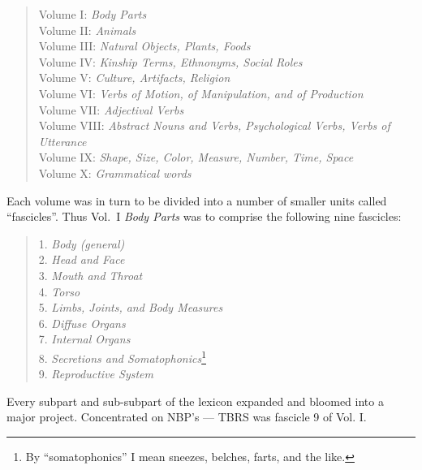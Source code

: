 \begin{quote}
{\footnotesize
Volume I: \textit{Body Parts}\nopagebreak[4]\\
Volume II: \textit{Animals}\\
Volume III: \textit{Natural Objects, Plants, Foods }\\
Volume IV: \textit{Kinship Terms, Ethnonyms, Social Roles}\\
Volume V: \textit{Culture, Artifacts, Religion}\\
Volume VI: \textit{Verbs of Motion, of Manipulation, and of Production}\\
Volume VII: \textit{Adjectival Verbs}\\
Volume VIII: \textit{Abstract Nouns and Verbs, Psychological Verbs, Verbs of Utterance }\\
Volume IX: \textit{Shape, Size, Color, Measure, Number, Time, Space}\\
Volume X: \textit{Grammatical words}\\
}
\end{quote}

Each volume was in turn to be divided into a number of smaller units called
“fascicles”. Thus Vol.~I \textit{Body Parts} was to comprise the following nine
fascicles:

\begin{quote}
{\footnotesize
1. \textit{Body (general)}\\
2. \textit{Head and Face}\\
3. \textit{Mouth and Throat}\\
4. \textit{Torso}\\
5. \textit{Limbs, Joints, and Body Measures}\\
6. \textit{Diffuse Organs}\\
7. \textit{Internal Organs}\\
8. \textit{Secretions and Somatophonics}\footnote{By “somatophonics” I mean sneezes,
belches, farts, and the like.}\\
9. \textit{Reproductive System}\\
}
\end{quote}

Every subpart and sub-subpart of the lexicon expanded and bloomed into a major project. Concentrated on NBP's --- TBRS was fascicle 9 of Vol. I.


